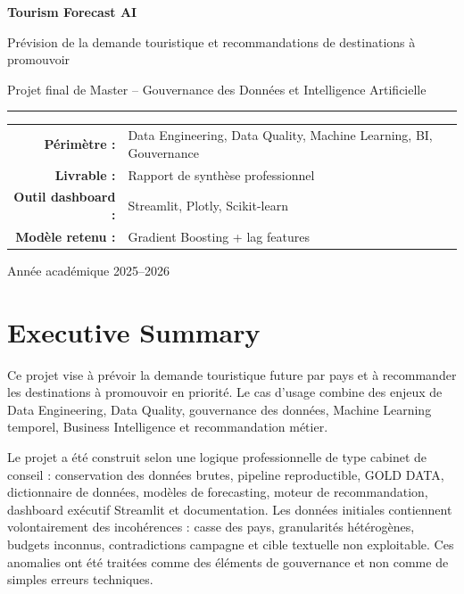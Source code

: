 \documentclass[11pt,a4paper]{report}
\begin{document}
\begin{titlepage}
    \centering
    \vspace*{1.5cm}
    {\Huge \textbf{\color{primary}Tourism Forecast AI}\par}
    \vspace{0.4cm}
    {\Large Prévision de la demande touristique et recommandations de destinations à promouvoir\par}
    \vspace{1.2cm}
    {\large Projet final de Master -- Gouvernance des Données et Intelligence Artificielle\par}
    \vspace{1.5cm}
    \rule{0.8\textwidth}{0.5pt}
    \vspace{0.8cm}

    \begin{tabular}{rl}
        \textbf{Périmètre :} & Data Engineering, Data Quality, Machine Learning, BI, Gouvernance \\
        \textbf{Livrable :} & Rapport de synthèse professionnel \\
        \textbf{Outil dashboard :} & Streamlit, Plotly, Scikit-learn \\
        \textbf{Modèle retenu :} & Gradient Boosting + lag features \\
    \end{tabular}

    \vfill
    {\large Année académique 2025--2026\par}
\end{titlepage}

\tableofcontents
\listoftables
\newpage

\chapter*{Executive Summary}

Ce projet vise à prévoir la demande touristique future par pays et à recommander les destinations à promouvoir en priorité. Le cas d'usage combine des enjeux de Data Engineering, Data Quality, gouvernance des données, Machine Learning temporel, Business Intelligence et recommandation métier.

Le projet a été construit selon une logique professionnelle de type cabinet de conseil : conservation des données brutes, pipeline reproductible, GOLD DATA, dictionnaire de données, modèles de forecasting, moteur de recommandation, dashboard exécutif Streamlit et documentation. Les données initiales contiennent volontairement des incohérences : casse des pays, granularités hétérogènes, budgets inconnus, contradictions campagne et cible textuelle non exploitable. Ces anomalies ont été traitées comme des éléments de gouvernance et non comme de simples erreurs techniques.
\end{document}
